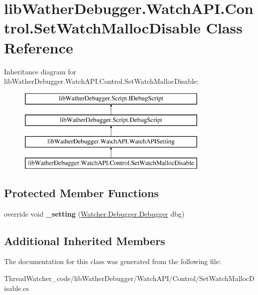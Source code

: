 \hypertarget{classlib_wather_debugger_1_1_watch_a_p_i_1_1_control_1_1_set_watch_malloc_disable}{\section{lib\+Wather\+Debugger.\+Watch\+A\+P\+I.\+Control.\+Set\+Watch\+Malloc\+Disable Class Reference}
\label{classlib_wather_debugger_1_1_watch_a_p_i_1_1_control_1_1_set_watch_malloc_disable}
}
Inheritance diagram for lib\+Wather\+Debugger.\+Watch\+A\+P\+I.\+Control.\+Set\+Watch\+Malloc\+Disable\+:\begin{figure}[H]
\begin{center}
\leavevmode
\includegraphics[height=4.000000cm]{classlib_wather_debugger_1_1_watch_a_p_i_1_1_control_1_1_set_watch_malloc_disable}
\end{center}
\end{figure}
\subsection*{Protected Member Functions}
\begin{DoxyCompactItemize}
\item 
\hypertarget{classlib_wather_debugger_1_1_watch_a_p_i_1_1_control_1_1_set_watch_malloc_disable_a5461146a411bc8c3a24cabd0df8b7bd0}{override void {\bfseries \+\_\+setting} (\hyperlink{class_watcher_1_1_debugger_1_1_debugger}{Watcher.\+Debugger.\+Debugger} dbg)}\label{classlib_wather_debugger_1_1_watch_a_p_i_1_1_control_1_1_set_watch_malloc_disable_a5461146a411bc8c3a24cabd0df8b7bd0}

\end{DoxyCompactItemize}
\subsection*{Additional Inherited Members}


The documentation for this class was generated from the following file\+:\begin{DoxyCompactItemize}
\item 
Thread\+Watcher\+\_\+code/lib\+Wather\+Debugger/\+Watch\+A\+P\+I/\+Control/Set\+Watch\+Malloc\+Disable.\+cs\end{DoxyCompactItemize}
